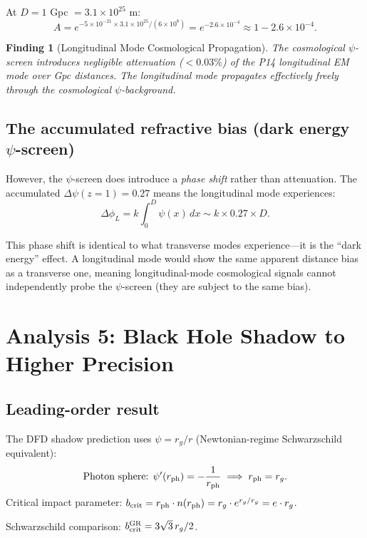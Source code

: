 \documentclass[11pt]{article}
\newtheorem{finding}{Finding}
\newcommand{\ee}[1]{\times 10^{#1}}
\begin{document}
At $D = 1$ Gpc $= 3.1\ee{25}$ m:
\[
A = e^{-5\ee{-21} \times 3.1\ee{25}/(6\ee{8})} = e^{-2.6\ee{-4}} \approx 1 - 2.6\ee{-4}.
\]

\begin{finding}[Longitudinal Mode Cosmological Propagation]
The cosmological $\psi$-screen introduces negligible attenuation ($< 0.03\%$) of the P14 longitudinal EM mode over Gpc distances. The longitudinal mode propagates effectively freely through the cosmological $\psi$-background.
\end{finding}

\subsection{The accumulated refractive bias (dark energy $\psi$-screen)}

However, the $\psi$-screen does introduce a \emph{phase shift} rather than attenuation. The accumulated $\Delta\psi(z=1) = 0.27$ means the longitudinal mode experiences:
\[
\Delta\phi_L = k \int_0^D \psi(x)\,dx \sim k \times 0.27 \times D.
\]

This phase shift is identical to what transverse modes experience---it is the ``dark energy'' effect. A longitudinal mode would show the same apparent distance bias as a transverse one, meaning longitudinal-mode cosmological signals cannot independently probe the $\psi$-screen (they are subject to the same bias).

\section{Analysis 5: Black Hole Shadow to Higher Precision}
\label{sec:shadow}

\subsection{Leading-order result}

The DFD shadow prediction uses $\psi = r_g/r$ (Newtonian-regime Schwarzschild equivalent):
\[
\text{Photon sphere: } \psi'(r_{\rm ph}) = -\frac{1}{r_{\rm ph}} \implies r_{\rm ph} = r_g.
\]
Critical impact parameter: $b_{\rm crit} = r_{\rm ph} \cdot n(r_{\rm ph}) = r_g \cdot e^{r_g/r_g} = e \cdot r_g$.

Schwarzschild comparison: $b_{\rm crit}^{\rm GR} = 3\sqrt{3}\,r_g/2$.
\end{document}
